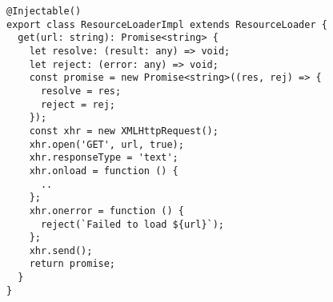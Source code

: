 \begin{verbatim}
@Injectable()
export class ResourceLoaderImpl extends ResourceLoader {
  get(url: string): Promise<string> {
    let resolve: (result: any) => void;
    let reject: (error: any) => void;
    const promise = new Promise<string>((res, rej) => {
      resolve = res;
      reject = rej;
    });
    const xhr = new XMLHttpRequest();
    xhr.open('GET', url, true);
    xhr.responseType = 'text';
    xhr.onload = function () {
      ..
    };
    xhr.onerror = function () {
      reject(`Failed to load ${url}`);
    };
    xhr.send();
    return promise;
  }
}
\end{verbatim}
